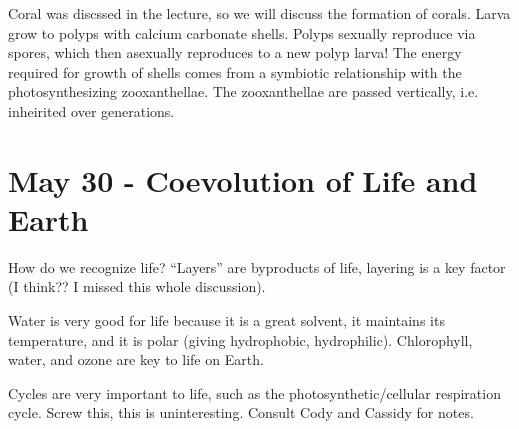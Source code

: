 \documentclass[12pt]{article}
\begin{document}
Coral was discssed in the lecture, so we will discuss the formation of corals. Larva grow to polyps with calcium carbonate shells. Polyps sexually reproduce via spores, which then asexually reproduces to a new polyp larva! The energy required for growth of shells comes from a symbiotic relationship with the photosynthesizing zooxanthellae. The zooxanthellae are passed vertically, i.e. inheirited over generations.

\section*{May 30 - Coevolution of Life and Earth}

How do we recognize life? ``Layers'' are byproducts of life, layering is a key factor (I think?? I missed this whole discussion).

Water is very good for life because it is a great solvent, it maintains its temperature, and it is polar (giving hydrophobic, hydrophilic). Chlorophyll, water, and ozone are key to life on Earth.

Cycles are very important to life, such as the photosynthetic/cellular respiration cycle. Screw this, this is uninteresting. Consult Cody and Cassidy for notes.
\end{document}
